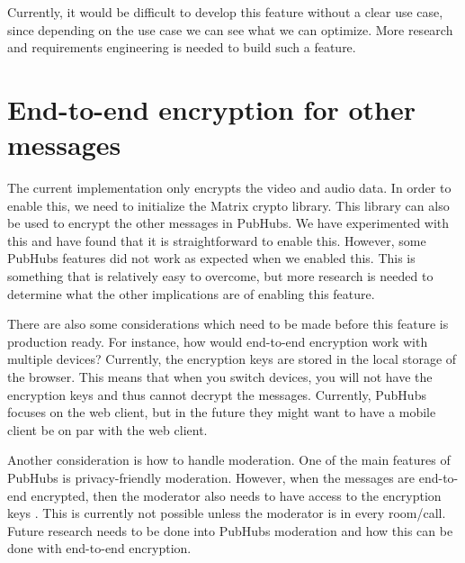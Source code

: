 \documentclass{report}
\begin{document}
Currently, it would be difficult to develop this feature without a clear use case, since depending on the use case we can
see what we can optimize. More research and requirements engineering is needed to build such a feature.

\section{End-to-end encryption for other messages}\label{sec:encryption_of_messages}
The current implementation only encrypts the video and audio data. In order to enable this, we need to initialize the
Matrix crypto library. This library can also be used to encrypt the other messages in PubHubs. We have experimented
with this and have found that it is straightforward to enable this. However, some PubHubs features did not work as expected
when we enabled this. This is something that is relatively easy to overcome, but more research is needed to determine
what the other implications are of enabling this feature.

There are also some considerations which need to be made before this feature is production ready.
For instance, how would end-to-end encryption work with multiple devices? Currently, the encryption keys are stored in
the local storage of the browser. This means that when you switch devices, you will not have the encryption keys and
thus cannot decrypt the messages. Currently, PubHubs focuses on the web client, but in the future they might want to
have a mobile client be on par with the web client.

Another consideration is how to handle moderation. One of the main features of PubHubs is privacy-friendly
moderation. However, when the messages are end-to-end encrypted, then the moderator also needs to have access to
the encryption keys \cite{noauthor_group_nodate}. This is currently not possible unless the moderator is in every
room/call. Future research needs to be done into PubHubs moderation and how this can be done with end-to-end encryption.

\newpage


\end{document}
